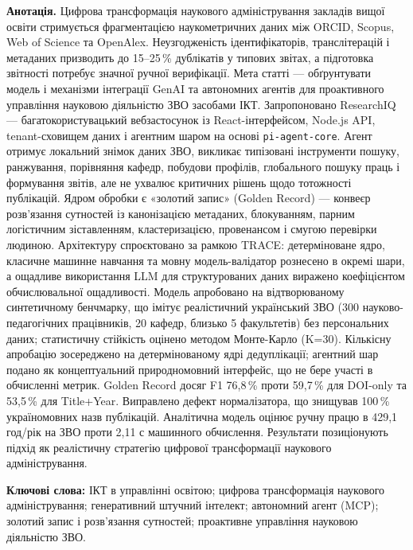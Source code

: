 \textbf{Анотація.} Цифрова трансформація наукового адміністрування закладів вищої освіти стримується фрагментацією наукометричних даних між ORCID, Scopus, Web of Science та OpenAlex. Неузгодженість ідентифікаторів, транслітерацій і метаданих призводить до 15--25\,\% дублікатів у типових звітах, а підготовка звітності потребує значної ручної верифікації. Мета статті --- обґрунтувати модель і механізми інтеграції GenAI та автономних агентів для проактивного управління науковою діяльністю ЗВО засобами ІКТ. Запропоновано ResearchIQ --- багатокористувацький вебзастосунок із React-інтерфейсом, Node.js API, tenant-сховищем даних і агентним шаром на основі \texttt{pi-agent-core}. Агент отримує локальний знімок даних ЗВО, викликає типізовані інструменти пошуку, ранжування, порівняння кафедр, побудови профілів, глобального пошуку праць і формування звітів, але не ухвалює критичних рішень щодо тотожності публікацій. Ядром обробки є «золотий запис» (Golden Record) --- конвеєр розв'язання сутностей із канонізацією метаданих, блокуванням, парним логістичним зіставленням, кластеризацією, провенансом і смугою перевірки людиною. Архітектуру спроєктовано за рамкою TRACE: детерміноване ядро, класичне машинне навчання та мовну модель-валідатор рознесено в окремі шари, а ощадливе використання LLM для структурованих даних виражено коефіцієнтом обчислювальної ощадливості. Модель апробовано на відтворюваному синтетичному бенчмарку, що імітує реалістичний український ЗВО (300 науково-педагогічних працівників, 20 кафедр, близько 5 факультетів) без персональних даних; статистичну стійкість оцінено методом Монте-Карло (K=30). Кількісну апробацію зосереджено на детермінованому ядрі дедуплікації; агентний шар подано як концептуальний природномовний інтерфейс, що не бере участі в обчисленні метрик. Golden Record досяг F1 76,8\,\% проти 59,7\,\% для DOI-only та 53,5\,\% для Title+Year. Виправлено дефект нормалізатора, що знищував 100\,\% україномовних назв публікацій. Аналітична модель оцінює ручну працю в 429,1 год/рік на ЗВО проти 2,11 с машинного обчислення. Результати позиціонують підхід як реалістичну стратегію цифрової трансформації наукового адміністрування.

\textbf{Ключові слова:} ІКТ в управлінні освітою; цифрова трансформація наукового адміністрування; генеративний штучний інтелект; автономний агент (MCP); золотий запис і розв'язання сутностей; проактивне управління науковою діяльністю ЗВО.

\bigskip

